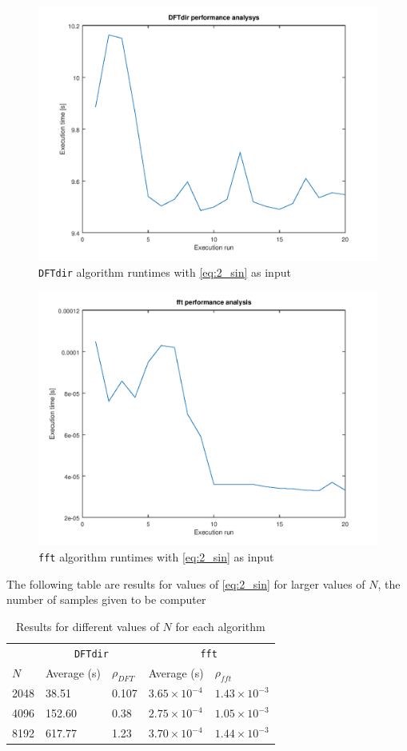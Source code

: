 \documentclass[a4paper, 12pt]{report}
\begin{document}
			\begin{figure}[H]
				\centering
				\includegraphics[width=.8\textwidth]{img/2_3.png}
				\caption{\texttt{DFTdir} algorithm runtimes with \eqref{eq:2_sin} as input}
				\label{fig:2_dft_performance}
			\end{figure}

			\begin{figure}[H]
				\centering
				\includegraphics[width=.8\textwidth]{img/2_4.png}
				\caption{\texttt{fft} algorithm runtimes with \eqref{eq:2_sin} as input}
				\label{fig:2_fft_performance}
			\end{figure}

			The following table are results for values of \eqref{eq:2_sin} for larger values of $N$, the number of samples given to be computer
			\begin{table}[H]
				\begin{tabularx}{\textwidth}{X X X X X}
					\toprule
					& \multicolumn{2}{c}{\texttt{DFTdir}} & \multicolumn{2}{c}{\texttt{fft}} \\
					$N$ & Average (s) & $\rho_{DFT}$ & Average (s) & $\rho_{fft}$ \\
					\midrule
					2048 & 38.51 & 0.107 & $3.65 \times 10^{-4}$ & $1.43 \times 10^{-3}$ \\
					4096 & 152.60 & 0.38 & $2.75 \times 10^{-4}$ & $1.05 \times 10^{-3}$ \\
					8192 & 617.77 & 1.23 & $3.70 \times 10^{-4}$ & $1.44 \times 10^{-3}$ \\
					\bottomrule
				\end{tabularx}
				\caption{Results for different values of $N$ for each algorithm}
				\label{table:2_1}
			\end{table}
\end{document}
